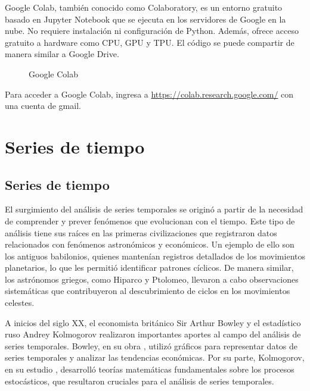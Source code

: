 \documentclass[
  us-letterpaper,
]{scrreprt}
\theoremstyle{plain}
\theoremstyle{definition}
\theoremstyle{definition}
\theoremstyle{remark}
\begin{document}
Google Colab, también conocido como Colaboratory, es un entorno gratuito
basado en Jupyter Notebook que se ejecuta en los servidores de Google en
la nube. No requiere instalación ni configuración de Python. Además,
ofrece acceso gratuito a hardware como CPU, GPU y TPU. El código se
puede compartir de manera similar a Google Drive.

\begin{figure}


\caption{\label{fig-colab}Google Colab}

\end{figure}%

Para acceder a Google Colab, ingresa a
\url{https://colab.research.google.com/} con una cuenta de gmail.

\part{Series de tiempo}

\chapter{Series de tiempo}\label{series-de-tiempo-1}

El surgimiento del análisis de series temporales se originó a partir de
la necesidad de comprender y prever fenómenos que evolucionan con el
tiempo. Este tipo de análisis tiene sus raíces en las primeras
civilizaciones que registraron datos relacionados con fenómenos
astronómicos y económicos. Un ejemplo de ello son los antiguos
babilonios, quienes mantenían registros detallados de los movimientos
planetarios, lo que les permitió identificar patrones cíclicos. De
manera similar, los astrónomos griegos, como Hiparco y Ptolomeo,
llevaron a cabo observaciones sistemáticas que contribuyeron al
descubrimiento de ciclos en los movimientos celestes.

A inicios del siglo XX, el economista británico Sir Arthur Bowley y el
estadístico ruso Andrey Kolmogorov realizaron importantes aportes al
campo del análisis de series temporales. Bowley, en su obra
\autocite{bowley1926elements}, utilizó gráficos para representar datos
de series temporales y analizar las tendencias económicas. Por su parte,
Kolmogorov, en su estudio \autocite{kolmogorov1941interpolation},
desarrolló teorías matemáticas fundamentales sobre los procesos
estocásticos, que resultaron cruciales para el análisis de series
temporales.
\end{document}
